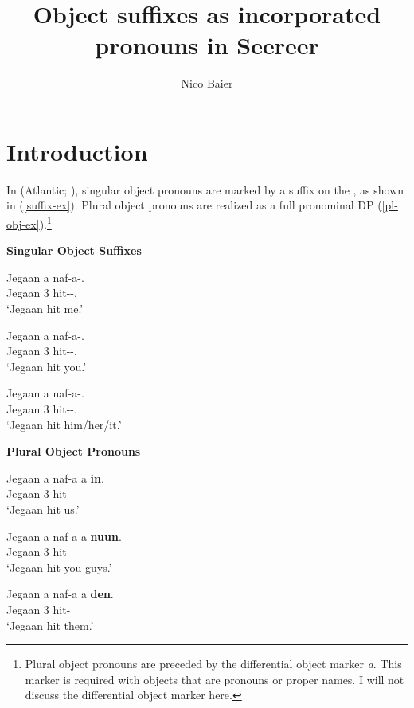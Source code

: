 \documentclass[output=paper,
modfonts
]{langscibook}
\title{Object suffixes as incorporated pronouns in Seereer}
\author{Nico Baier}
\begin{document}
\maketitle 
 


 

\section{Introduction}\label{sec:baier:1}

In  (Atlantic; ), singular object pronouns are marked by a suffix on the , as shown in (\ref{suffix-ex}). Plural object pronouns are realized as a full pronominal DP (\ref{pl-obj-ex}).\footnote{Plural object pronouns are preceded by the differential object marker \textit{a}. This marker is required with objects that are pronouns or proper names. I will not discuss the differential object marker here.}


\begin{exe}
\ex \label{suffix-ex} \textbf{Singular Object Suffixes}
\begin{multicols}{2}
\begin{xlista}
\ex \gll Jegaan a naf-a-.\\
Jegaan 3 hit-\Dv{}-\Fsg{}.\Obj{} \\
\glt `Jegaan hit me.'

\ex \gll Jegaan a naf-a-.\\
Jegaan 3 hit-\Dv{}-\Ssg{}.\Obj{} \\
\glt `Jegaan hit you.'

\ex \gll Jegaan a naf-a-.\\
Jegaan 3 hit-\Dv{}-\Tsg{}.\Obj{} \\
\glt `Jegaan hit him/her/it.'
\end{xlista}
\end{multicols}
\end{exe}

\begin{exe}
\ex \label{pl-obj-ex} \textbf{Plural Object Pronouns}
\begin{multicols}{2}
\begin{xlista}
\ex \gll Jegaan a naf-a a \textbf{in}.\\
Jegaan 3 hit-\Dv{} \Obj{} \Fpl{} \\
\glt `Jegaan hit us.'

\ex \gll Jegaan a naf-a a \textbf{nuun}.\\
Jegaan 3 hit-\Dv{} \Obj{} \Spl{}  \\
\glt `Jegaan hit you guys.'

\ex \gll Jegaan a naf-a a \textbf{den}.\\
Jegaan 3 hit-\Dv{} \Obj{} \Tpl{}  \\
\glt `Jegaan hit them.'
\end{xlista}
\end{multicols}
\end{exe}
\end{document}
